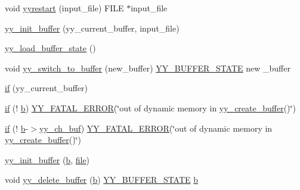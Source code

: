 \begin{DoxyCompactItemize}
\item 
void \mbox{\hyperlink{expr-lex_8cpp_a3528c58cdd338886f23357f42e2061b8}{yyrestart}} (input\+\_\+file) F\+I\+LE $\ast$input\+\_\+file
\item 
\mbox{\hyperlink{expr-lex_8cpp_aa8fb2edba7d58cb3cd859f2b7831efac}{yy\+\_\+init\+\_\+buffer}} (yy\+\_\+current\+\_\+buffer, input\+\_\+file)
\item 
\mbox{\hyperlink{expr-lex_8cpp_a30fc8e518fa4e332a8657f6f8afa8fd9}{yy\+\_\+load\+\_\+buffer\+\_\+state}} ()
\item 
void \mbox{\hyperlink{expr-lex_8cpp_a4f7f20d812f72fd97d855e769ad39cc5}{yy\+\_\+switch\+\_\+to\+\_\+buffer}} (new\+\_\+buffer) \mbox{\hyperlink{expr-lex_8cpp_a4e5bd2d129903df83f3d13effaf8f3e4}{Y\+Y\+\_\+\+B\+U\+F\+F\+E\+R\+\_\+\+S\+T\+A\+TE}} new \+\_\+buffer
\item 
\mbox{\hyperlink{expr-lex_8cpp_a287b9b5ee695381a7c406c22383cba19}{if}} (yy\+\_\+current\+\_\+buffer)
\item 
\mbox{\hyperlink{expr-lex_8cpp_a9bf79ca516efbf960603adf3563802dc}{if}} (! \mbox{\hyperlink{expr-lex_8cpp_a91b64995742fd30063314f12340b4b5a}{b}}) \mbox{\hyperlink{expr-lex_8cpp_ac0586b8b0b092d02f4ba7d45abe328f2}{Y\+Y\+\_\+\+F\+A\+T\+A\+L\+\_\+\+E\+R\+R\+OR}}(\char`\"{}out of dynamic memory in \mbox{\hyperlink{expr-lex_8cpp_a55588ac24161be2160e907e019dcae5c}{yy\+\_\+create\+\_\+buffer}}()\char`\"{})
\item 
\mbox{\hyperlink{expr-lex_8cpp_a3d50472f9bfe9159e10300a257ce89e5}{if}} (! \mbox{\hyperlink{expr-lex_8cpp_a91b64995742fd30063314f12340b4b5a}{b}}-\/$>$\mbox{\hyperlink{expr-lex_8cpp_a49f3339224f2ff52f9191b351b184dbd}{yy\+\_\+ch\+\_\+buf}}) \mbox{\hyperlink{expr-lex_8cpp_ac0586b8b0b092d02f4ba7d45abe328f2}{Y\+Y\+\_\+\+F\+A\+T\+A\+L\+\_\+\+E\+R\+R\+OR}}(\char`\"{}out of dynamic memory in \mbox{\hyperlink{expr-lex_8cpp_a55588ac24161be2160e907e019dcae5c}{yy\+\_\+create\+\_\+buffer}}()\char`\"{})
\item 
\mbox{\hyperlink{expr-lex_8cpp_a1ae002281d6d54c4ca55d32b423662f9}{yy\+\_\+init\+\_\+buffer}} (\mbox{\hyperlink{expr-lex_8cpp_a91b64995742fd30063314f12340b4b5a}{b}}, \mbox{\hyperlink{expr-lex_8cpp_a702945180aa732857b380a007a7e2a21}{file}})
\item 
void \mbox{\hyperlink{expr-lex_8cpp_a05a39a25571bbcfcf45a1e04a8c24f9b}{yy\+\_\+delete\+\_\+buffer}} (\mbox{\hyperlink{expr-lex_8cpp_a91b64995742fd30063314f12340b4b5a}{b}}) \mbox{\hyperlink{expr-lex_8cpp_a4e5bd2d129903df83f3d13effaf8f3e4}{Y\+Y\+\_\+\+B\+U\+F\+F\+E\+R\+\_\+\+S\+T\+A\+TE}} \mbox{\hyperlink{expr-lex_8cpp_a91b64995742fd30063314f12340b4b5a}{b}}

\end{DoxyCompactItemize}

